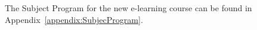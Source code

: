 The Subject Program for the new e-learning course can be found in Appendix~\ref{appendix:SubjecProgram}.

%
%
%

